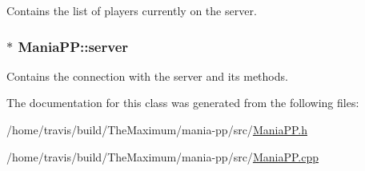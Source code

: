 Contains the list of players currently on the server. 

\hypertarget{classManiaPP_ab81311d6901990cb99a7a30e0cbaab11}{
\subsubsection[{server}]{$\ast$ Mania\-P\-P\-::server\hspace{0.3cm}{\ttfamily [private]}}}\label{classManiaPP_ab81311d6901990cb99a7a30e0cbaab11}


Contains the connection with the server and its methods. 



The documentation for this class was generated from the following files\-:\begin{DoxyCompactItemize}
\item 
/home/travis/build/\-The\-Maximum/mania-\/pp/src/\hyperlink{ManiaPP_8h}{Mania\-P\-P.\-h}\item 
/home/travis/build/\-The\-Maximum/mania-\/pp/src/\hyperlink{ManiaPP_8cpp}{Mania\-P\-P.\-cpp}\end{DoxyCompactItemize}
